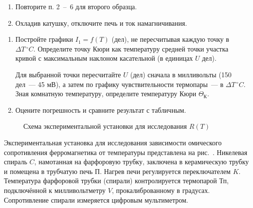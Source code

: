 \begin{lab:task}
\begin{enumerate}
\item
  Повторите п. 2~--~6 для второго образца.
\item
  Охладив катушку, отключите печь и ток намагничивания.
\end{enumerate}
\begin{enumerate}

\item
  Постройте графики $I_1 = f(T)$ (дел), не пересчитывая каждую точку в $\Delta
T\,^{\circ} C$. Определите точку Кюри как температуру средней точки участка
кривой с максимальным наклоном касательной (в единицах $U$ дел).

Для выбранной точки пересчитайте $U$ (дел) сначала в милливольты (150 дел~---
45 мВ), а затем по графику чувствительности термопары~--- в  $\Delta
T\,^{\circ} C$. Зная комнатную температуру, определите температуру Кюри
$\Theta_{К}$.


\item
  Оцените погрешность и сравните результат с табличным.
\end{enumerate}

\end{lab:task}


\experiment

\begin{figure}[h!]
\centering
	\caption{Схема экспериментальной установки для исследования $R(T)$}
\end{figure}
Экспериментальная установка для исследования зависимости омического
сопротивления ферромагнетика от температуры представлена на
рис.~. Никелевая спираль $C$,
намотанная на фарфоровую трубку, заключена в керамическую трубку и помещена в
трубчатую печь $\text{П}$. Нагрев печи регулируется переключателем $K$.
Температура фарфоровой трубки (спирали) контролируется термопарой $\text{Тп}$,
подключённой к милливольтметру $V$, прокалиброванному в градусах. Сопротивление
спирали измеряется цифровым мультиметром.


